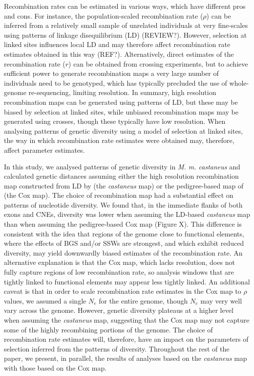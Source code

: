 	Recombination rates can be estimated in various ways, which have different pros and cons. For instance, the population-scaled recombination rate ($\rho$) can be inferred from a relatively small sample of unrelated individuals at very fine-scales using patterns of linkage disequilibrium (LD) (REVIEW?). However, selection at linked sites influences local LD and may therefore affect recombination rate estimates obtained in this way (REF?). Alternatively, direct estimates of the recombination rate ($r$) can be obtained from crossing experiments, but to achieve sufficient power to generate recombination maps a very large number of individuals need to be genotyped, which has typically precluded the use of whole-genome re-sequencing, limiting resolution. In summary, high resolution recombination maps can be generated using patterns of LD, but these may be biased by selection at linked sites, while unbiased recombination maps may be generated using crosses, though these typically have low resolution. When analysing patterns of genetic diversity using a model of selection at linked sites, the way in which recombination rate estimates were obtained may, therefore, affect parameter estimates.

	In this study, we analysed patterns of genetic diversity in \textit{M. m. castaneus} and calculated genetic distances assuming either the high resolution recombination map constructed from LD by \cite{RN340}(the \textit{castaneus} map) or the pedigree-based map of \cite{RN232} (the Cox map). The choice of recombination map had a substantial effect on patterns of nucleotide diversity. We found that, in the immediate flanks of both exons and CNEs, diversity was lower when assuming the LD-based \textit{castaneus} map than when assuming the pedigree-based Cox map (Figure X). This difference is consistent with the idea that regions of the genome close to functional elements, where the effects of BGS and/or SSWs are strongest, and which exhibit reduced diversity, may yield downwardly biased estimates of the recombination rate. An alternative explanation is that the Cox map, which lacks resolution, does not fully capture regions of low recombination rate, so analysis windows that are tightly linked to functional elements may appear less tightly linked. An additional caveat is that in order to scale  recombination rate estimates in the Cox map to $\rho$ values, we assumed a single $N_e$ for the entire genome, though $N_e$ may very well vary across the genome. However, genetic diversity  plateaus at a higher level when assuming the \textit{castaneus} map, suggesting that the Cox map may not capture some of the highly recombining portions of the genome. The choice of recombination rate estimates will, therefore, have an impact on the parameters of selection inferred from the patterns of diversity. Throughout the rest of the paper, we present, in parallel, the results of analyses based on the \textit{castaneus} map with those based on the Cox map.


